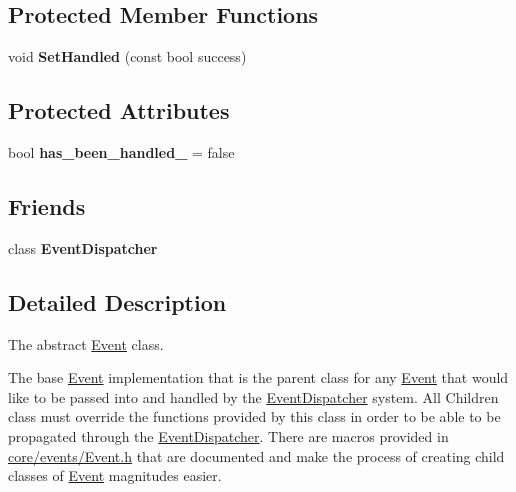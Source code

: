 \subsection*{Protected Member Functions}
\begin{DoxyCompactItemize}
\item 
\mbox{\label{classengine_1_1events_1_1Event_aa85c36143880a3312b1c63166463ef5d}} 
void {\bfseries Set\+Handled} (const bool success)
\end{DoxyCompactItemize}
\subsection*{Protected Attributes}
\begin{DoxyCompactItemize}
\item 
\mbox{\label{classengine_1_1events_1_1Event_ad8e1eb6634225e11963228d6a69c166b}} 
bool {\bfseries has\+\_\+been\+\_\+handled\+\_\+} = false
\end{DoxyCompactItemize}
\subsection*{Friends}
\begin{DoxyCompactItemize}
\item 
\mbox{\label{classengine_1_1events_1_1Event_aad5f38ccd490ea17008460423f52325a}} 
class {\bfseries Event\+Dispatcher}
\end{DoxyCompactItemize}


\subsection{Detailed Description}
The abstract \hyperlink{classengine_1_1events_1_1Event}{Event} class. 

The base \hyperlink{classengine_1_1events_1_1Event}{Event} implementation that is the parent class for any \hyperlink{classengine_1_1events_1_1Event}{Event} that would like to be passed into and handled by the \hyperlink{classengine_1_1events_1_1EventDispatcher}{Event\+Dispatcher} system. All Children class must override the functions provided by this class in order to be able to be propagated through the \hyperlink{classengine_1_1events_1_1EventDispatcher}{Event\+Dispatcher}. There are macros provided in {\ttfamily \hyperlink{Event_8h}{core/events/\+Event.\+h}} that are documented and make the process of creating child classes of \hyperlink{classengine_1_1events_1_1Event}{Event} magnitudes easier. 

